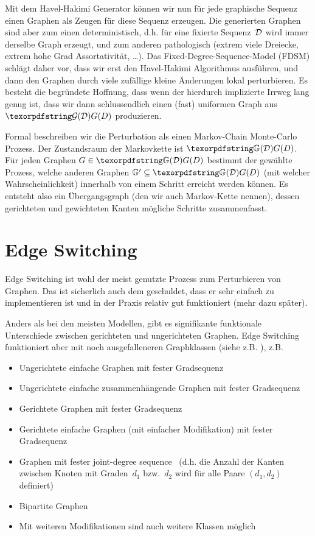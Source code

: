 Mit dem Havel-Hakimi Generator können wir nun für jede graphische Sequenz einen Graphen als Zeugen für diese Sequenz erzeugen.
Die generierten Graphen sind aber zum einen deterministisch, d.h. für eine fixierte Sequenz~$\mathcal{D}$ wird immer derselbe Graph erzeugt, und zum anderen pathologisch (extrem viele Dreiecke, extrem hohe Grad Assortativität, \ldots).
Das Fixed-Degree-Sequence-Model (FDSM) schlägt daher vor, dass wir erst den Havel-Hakimi Algorithmus ausführen, und dann den Graphen durch viele zufällige kleine Änderungen lokal perturbieren.
Es besteht die begründete Hoffnung, dass wenn der hierdurch implizierte Irrweg lang genug ist, dass wir dann schlussendlich einen (fast) uniformen Graph aus $\Gd$ produzieren.

Formal beschreiben wir die Perturbation als einen Markov-Chain Monte-Carlo Prozess.
Der Zustandsraum der Markovkette ist $\gd$.
Für jeden Graphen $G \in \gd$ bestimmt der gewählte Prozess, welche anderen Graphen $\mathbb G' \subseteq \gd$ (mit welcher Wahrscheinlichkeit) innerhalb von einem Schritt erreicht werden können.
Es entsteht also ein  Übergangsgraph (den wir auch Markov-Kette nennen), dessen gerichteten und gewichteten Kanten mögliche Schritte zusammenfasst.

\section{Edge Switching}
Edge Switching ist wohl der meist genutzte Prozess zum Perturbieren von Graphen.
Das ist sicherlich auch dem geschuldet, dass er sehr einfach zu implementieren ist und in der Praxis relativ gut funktioniert (mehr dazu später).

Anders als bei den meisten Modellen, gibt es signifikante funktionale Unterschiede zwischen gerichteten und ungerichteten Graphen.
Edge Switching funktioniert aber mit noch ausgefalleneren Graphklassen (siehe z.B. \cite{carstens_2017}), z.B.
\begin{itemize}
    \item Ungerichtete einfache Graphen mit fester Gradsequenz
    \item Ungerichtete einfache zusammenhängende Graphen  mit fester Gradsequenz \cite{DBLP:journals/compnet/VigerL16}
    \item Gerichtete Graphen  mit fester Gradsequenz
    \item Gerichtete einfache Graphen (mit einfacher Modifikation)  mit fester Gradsequenz
    \item Graphen mit fester joint-degree sequence~\cite{DBLP:conf/alenex/StantonP11} (d.h. die Anzahl der Kanten zwischen Knoten mit Graden~$d_1$ bzw.~$d_2$ wird für alle Paare $(d_1, d_2)$ definiert)
    \item Bipartite Graphen
    \item Mit weiteren Modifikationen sind auch weitere Klassen möglich
\end{itemize}


